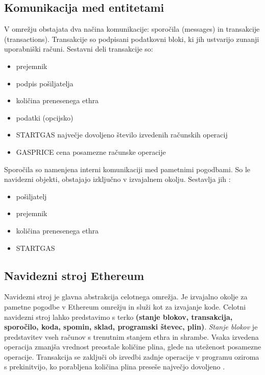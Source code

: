 \documentclass[a4paper, 12pt]{book}
\begin{document}
\subsection{Komunikacija med entitetami}
V omrežju obstajata dva načina komunikacije: sporočila (messages) in transakcije (transactions).
Transakcije so podpisani podatkovni bloki, ki jih ustvarijo zunanji uporabniški računi.
Sestavni deli transakcije so:
\begin{itemize}
	\item prejemnik
	\item podpis pošiljatelja
	\item količina prenesenega ethra
	\item podatki (opcijsko)
	\item STARTGAS največje dovoljeno število izvedenih računskih operacij
	\item GASPRICE cena posamezne računske operacije
\end{itemize}

Sporočila so namenjena interni komunikaciji med pametnimi pogodbami.
So le navidezni objekti, obstajajo izključno v izvajalnem okolju.
Sestavlja jih \cite{ethereumWhitepaper}:
\begin{itemize}
	\item pošiljatelj
	\item prejemnik
	\item količina prenesenega ethra
	\item STARTGAS
\end{itemize}


\subsection{Navidezni stroj Ethereum}

Navidezni stroj je glavna abstrakcija celotnega omrežja.
Je izvajalno okolje za pametne pogodbe v Ethereum omrežju in služi kot  za izvajanje kode.
Celotni navidezni stroj lahko predstavimo s terko \textbf{(stanje blokov, transakcija, sporočilo, koda, spomin, sklad, programski števec, plin)}.
\textit{Stanje blokov} je predstavitev vseh računov s trenutnim stanjem ethra in shrambe.
Vsaka izvedena operacija zmanjša vrednost preostale količine plina, glede na uteženost posamezne operacije.
Transakcija se zaključi ob izvedbi zadnje operacije v programu oziroma s prekinitvijo, ko porabljena količina plina preseše največjo dovoljeno \cite{ethereumWhitepaper}.
\end{document}
